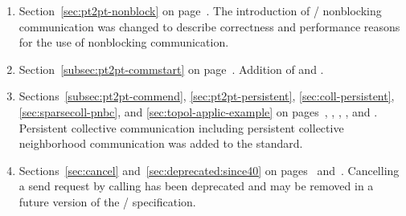 \begin{enumerate}
\item
{}
Section~\ref{sec:pt2pt-nonblock} on page~\pageref{sec:pt2pt-nonblock}.
\newline
The introduction of \MPI/ nonblocking communication was changed to
describe correctness and performance reasons for the use of nonblocking communication.

\item
  Section~\ref{subsec:pt2pt-commstart} on page~\pageref{subsec:pt2pt-commstart}.
  \newline
  Addition of
   and
  .

\item
Sections~\ref{subsec:pt2pt-commend}, \ref{sec:pt2pt-persistent}, \ref{sec:coll-persistent}, \ref{sec:sparsecoll-pnbc}, and \ref{sec:topol-applic-example} on pages~\pageref{subsec:pt2pt-commend}, \pageref{sec:pt2pt-persistent}, \pageref{sec:coll-persistent}, \pageref{sec:sparsecoll-pnbc}, and \pageref{sec:topol-applic-example}.
\newline
Persistent collective communication 
%
%
%
%
%
%
%
%
%
%
%
%
%
%
%
%
%
including persistent collective neighborhood communication
%
%
%
%
%
\vlgb{}
was added to the standard.

\item
{}
Sections~\ref{sec:cancel} and~\ref{sec:deprecated:since40} on pages~\pageref{sec:cancel} and~\pageref{sec:deprecated:since40}.
\newline
Cancelling a send request by calling  has been deprecated and may be removed in a future version of the \MPI/ specification.


\end{enumerate}
